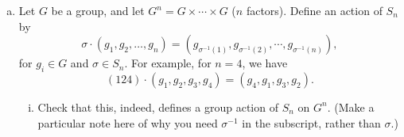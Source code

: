 \documentclass[11pt, reqno]{amsart}
\theoremstyle{plain}
\theoremstyle{definition}
\theoremstyle{example}
\def\normeq{\unlhd}
\begin{document}
\begin{enumerate}[1.]
\begin{enumerate}[(a)]
\begin{proof}
and, 
$$(A_1/B_1) \times \cdots \times (A_n/B_n) = \{a_1B_1 \ | \ a_1 \in A_1\} \times \cdots \times \{a_nB_n \ | \ a_n \in A_n\}$$

Define $\varphi: \{a(B_1, \ldots, B_n) \ | \ a \in G\} \to \{a_1B_1 \ | \ a_1 \in A_1\} \times \cdots \times \{a_nB_n \ | \ a_n \in A_n\}$ such that $\varphi(a(B_1 \times \cdots \times B_n))) = a_1B_1 \times \cdots \times a_nB_n$ where $a = (a_1, \ldots, a_n)$.\\

Now let $a, a' \in A$ and suppose $\varphi(a(B_1 \times \cdots \times B_n))) = \varphi(a'(B_1 \times \cdots \times B_n)))$. Then,
\begin{align*}
a_1B_1 \times \cdots \times a_nB_n = a_1'B_1 \times \cdots \times a_n'B_n
\end{align*}

That is,
\begin{align*}
a_1B_1 &= a_1'B_1\\
a_2B_2 &= a_2'B_2\\
&\vdots\\
a_nB_n &= a_n'B_n
\end{align*}

Since $B_i \normeq A_i$, we have that $a_i = a_i'$ for every $i$. Thus, $\varphi$ is injective. Now suppose $a_1' \in A_1, \ldots, a_n' \in A_n$ and consider $a_1'B_1, \ldots, a_n'B_n$. Since $a_1' \in A_1, \ldots, a_2' \in A_2$, we can define $a' = (a_1', \ldots, a_n') \in G$. Hence, it is clear that,
\begin{align*}
\varphi(a'(B_1 \times \cdots \times B_n)) = a_1'B_1 \times \cdots a_n'B_n
\end{align*}

Thus, $\varphi$ is surjective and hence is a bijection. 
\end{proof}

\item Let $G$ be a group, and let $G^n = G \times \cdots \times G$ ($n$ factors). Define an action of $S_n$ by 
$$\sigma \cdot (g_1, g_2, \dots, g_n) = (g_{\sigma^{-1}(1)}, g_{\sigma^{-1}(2)},  \cdots, g_{\sigma^{-1}(n)}),$$
for $g_i \in G$ and $\sigma \in S_n$. For example, for $n = 4$, we have 
$$(124) \cdot (g_1, g_2, g_3, g_4) = (g_4, g_1, g_3, g_2).$$
\begin{enumerate}[(i)]
\item Check that this, indeed, defines a group action of $S_n$ on $G^n$. (Make a particular note here of why you need $\sigma^{-1}$ in the subscript, rather than $\sigma$.)


\end{enumerate}
\end{enumerate}
\end{enumerate}
\end{document}
